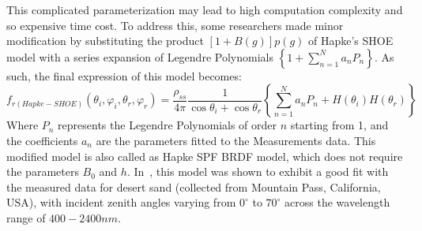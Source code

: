 This complicated parameterization may lead to high computation complexity and so expensive time cost.
To address this, some researchers made minor modification by substituting the product $\left[1 + B(g)\right] p(g)$ of Hapke's SHOE model with a series expansion of Legendre Polynomials $\left\{1 + \sum_{n=1}^{N} a_n P_n\right\}$.
As such, the final expression of this model becomes:
\begin{equation}
    f_{r(Hapke-SHOE)}(\theta_i, \varphi_i, \theta_r, \varphi_r) = \frac{\rho_{ss}}{4 \pi}%
    \frac{1}{\cos\theta_i + \cos\theta_r}%
    \left\{
    \sum_{n=1}^{N} a_n P_n%
    + H(\theta_i)H(\theta_r)%
    \right\}
\end{equation}
Where $P_n$ represents the Legendre Polynomials of order $n$ starting from 1, and the coefficients $a_n$ are the parameters fitted to the Measurements data.
This modified model is also called as Hapke SPF BRDF model, which does not require the parameters $B_0$ and $h$.
In~\cite{2022_Wise}, this model was shown to exhibit a good fit  with the measured data for desert sand (collected from Mountain Pass, California, USA), with incident zenith angles varying from $0^\circ$ to $70^\circ$ across the wavelength range of $400-2400 nm$.